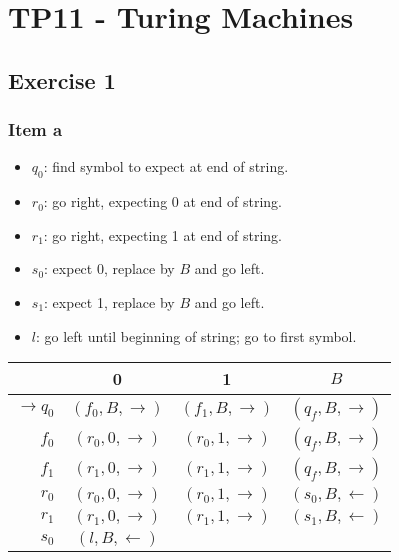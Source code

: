 \setcounter{section}{10}
\section{TP11 - Turing Machines}
{
\renewcommand{\thesubsubsection}{\thesubsection\alph{subsubsection}}
\subsection{Exercise 1}
\subsubsection{Item a}
\begin{minipage}[c]{0.47\textwidth}
	\begin{itemize}
		\itemsep0em
		\item $q_0$: find symbol to expect at end of string.
		\item $r_0$: go right, expecting 0 at end of string.
		\item $r_1$: go right, expecting 1 at end of string.
		\item $s_0$: expect 0, replace by $B$ and go left.
		\item $s_1$: expect 1, replace by $B$ and go left.
		\item $l$: go left until beginning of string; go to first symbol.
	\end{itemize}
\end{minipage}
\begin{minipage}[c]{0.47\textwidth}
	\begin{center}
		\begin{tabular}{r | c  c  c}
			                  & 0                     & 1                     & $B$            \\ \hline
			$\rightarrow q_0$ & $(f_0,B,\rightarrow)$ & $(f_1,B,\rightarrow)$ & $(q_f,B,\rightarrow)$ \\
			$            f_0$ & $(r_0,0,\rightarrow)$ & $(r_0,1,\rightarrow)$ & $(q_f,B,\rightarrow)$ \\
			$            f_1$ & $(r_1,0,\rightarrow)$ & $(r_1,1,\rightarrow)$ & $(q_f,B,\rightarrow)$ \\
			$            r_0$ & $(r_0,0,\rightarrow)$ & $(r_0,1,\rightarrow)$ & $(s_0,B,\leftarrow )$ \\
			$            r_1$ & $(r_1,0,\rightarrow)$ & $(r_1,1,\rightarrow)$ & $(s_1,B,\leftarrow )$ \\
			$            s_0$ & $(l  ,B,\leftarrow )$ &                       &                       \\

\end{tabular}
\end{center}
\end{minipage}}

